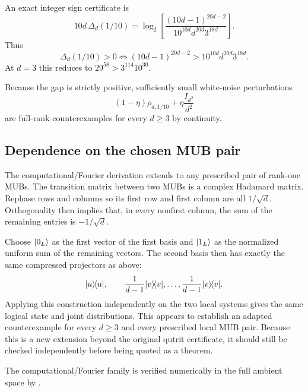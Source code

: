 An exact integer sign certificate is
\begin{equation}
10d\,\Delta_d(1/10)
=
\log_2\!\left[
\frac{(10d-1)^{20d-2}}{10^{10d}d^{20d}3^{18d}}
\right].
\end{equation}
Thus
\begin{equation}
\Delta_d(1/10)>0
\iff
(10d-1)^{20d-2}>10^{10d}d^{20d}3^{18d}.
\end{equation}
At $d=3$ this reduces to $29^{58}>3^{114}10^{30}$.

Because the gap is strictly positive, sufficiently small white-noise perturbations
\begin{equation}
(1-\eta)\rho_{d,1/10}+\eta\frac{I_{d^2}}{d^2}
\end{equation}
are full-rank counterexamples for every $d\ge3$ by continuity.

\subsection{Dependence on the chosen MUB pair}

The computational/Fourier derivation extends to any prescribed pair of rank-one MUBs. The transition matrix between two MUBs is a complex Hadamard matrix. Rephase rows and columns so its first row and first column are all $1/\sqrt d$. Orthogonality then implies that, in every nonfirst column, the sum of the remaining entries is $-1/\sqrt d$.

Choose $\lvert 0_L\rangle$ as the first vector of the first basis and $\lvert 1_L\rangle$ as the normalized uniform sum of the remaining vectors. The second basis then has exactly the same compressed projectors as above:
\begin{equation}
\lvert u\rangle\!\langle u\rvert,\qquad \frac{1}{d-1}\lvert v\rangle\!\langle v\rvert,\ldots,\frac{1}{d-1}\lvert v\rangle\!\langle v\rvert.
\end{equation}
Applying this construction independently on the two local systems gives the same logical state and joint distributions. This appears to establish an adapted counterexample for every $d\ge3$ and every prescribed local MUB pair. Because this is a new extension beyond the original qutrit certificate, it should still be checked independently before being quoted as a theorem.

The computational/Fourier family is verified numerically in the full ambient space by
.

